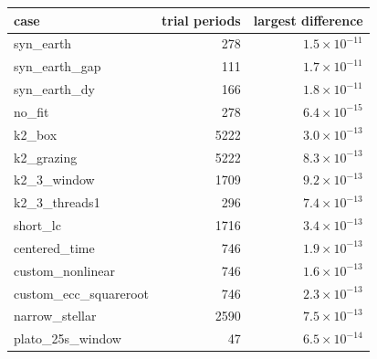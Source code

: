 \begin{tabular}{lrr}
\toprule
case & trial periods & largest difference \\
\midrule
syn\_earth & 278 & $1.5\times10^{-11}$ \\
syn\_earth\_gap & 111 & $1.7\times10^{-11}$ \\
syn\_earth\_dy & 166 & $1.8\times10^{-11}$ \\
no\_fit & 278 & $6.4\times10^{-15}$ \\
k2\_box & 5222 & $3.0\times10^{-13}$ \\
k2\_grazing & 5222 & $8.3\times10^{-13}$ \\
k2\_3\_window & 1709 & $9.2\times10^{-13}$ \\
k2\_3\_threads1 & 296 & $7.4\times10^{-13}$ \\
short\_lc & 1716 & $3.4\times10^{-13}$ \\
centered\_time & 746 & $1.9\times10^{-13}$ \\
custom\_nonlinear & 746 & $1.6\times10^{-13}$ \\
custom\_ecc\_squareroot & 746 & $2.3\times10^{-13}$ \\
narrow\_stellar & 2590 & $7.5\times10^{-13}$ \\
plato\_25s\_window & 47 & $6.5\times10^{-14}$ \\
\bottomrule
\end{tabular}
